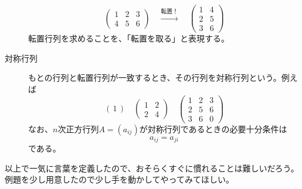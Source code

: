 \documentclass[10pt]{jsreport}
\theoremstyle{definition}%
\newcommand{\kakko}[1]{\left(#1 \right)} %
\numberwithin{equation}{section}%
\begin{document}
\begin{framed}
\begin{description}
    \begin{equation}
      \left( 
        \begin{matrix}
          1 & 2 & 3 \\
          4 & 5 & 6 
        \end{matrix}
      \right) \quad \overset{転置！}{\to} \quad\left( 
        \begin{matrix}
          1 & 4  \\
          2 & 5   \\
          3 & 6 
        \end{matrix}
      \right)
    \end{equation}
    転置行列を求めることを、「転置を取る」と表現する。
  \item[対称行列] もとの行列と転置行列が一致するとき、その行列を対称行列という。例えば
  \begin{equation}
 \label{taisho}   \kakko{ \, 1 \, }\quad \left( 
      \begin{matrix}
        1 & 2  \\
        2 & 4  
      \end{matrix}
    \right) \quad \left( 
      \begin{matrix}
        1 & 2 & 3 \\
        2 & 5 & 6 \\
        3 & 6 & 0
      \end{matrix}
    \right)
  \end{equation}
  なお、$n$次正方行列$A=(a_{ij})$が対称行列であるときの必要十分条件は
  \begin{equation}
    a_{ij}=a_{ji}
  \end{equation}
  である。
\end{description}
\end{framed}
以上で一気に言葉を定義したので、おそらくすぐに慣れることは難しいだろう。例題を少し用意したので少し手を動かしてやってみてほしい。
\end{document}
